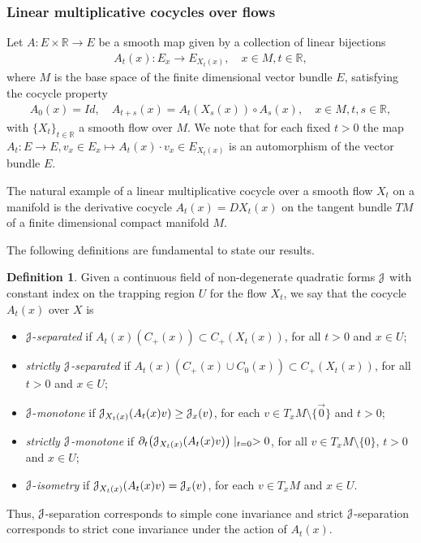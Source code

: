 \documentclass[12pt,reqno]{amsart}
\numberwithin{equation}{section}
\theoremstyle{plain}
\theoremstyle{definition}
\newtheorem{definition}{Definition}
\newcommand{\RR}{{\mathbb R}}
\newcommand{\J}{\EuScript{J}}
\begin{document}
\subsubsection{Linear multiplicative cocycles over flows}
\label{sec:linear-multipl-cocyc}

Let $A:E\times\RR\to E$ be a smooth map given by a collection of linear
bijections
\begin{align*}
  A_t(x): E_x\to E_{X_t(x)}, \quad x\in M, t\in\RR,
\end{align*}
where $M$ is the base space of the finite dimensional vector
bundle $E$, satisfying the cocycle property
\begin{align*}
  A_0(x)=Id, \quad A_{t+s}(x)=A_t(X_s(x))\circ A_s(x), \quad x\in M, t,s\in\RR,
\end{align*}
with $\{X_t\}_{t\in\RR}$ a smooth flow over $M$.  We note
that for each fixed $t>0$ the map $A_t: E\to E, v_x\in E_x
\mapsto A_t(x)\cdot v_x\in E_{X_t(x)}$ is an automorphism of
the vector bundle $E$.

The natural example of a linear multiplicative cocycle over
a smooth flow $X_t$ on a manifold is the derivative cocycle
$A_t(x)=DX_t(x)$ on the tangent bundle $TM$ of a finite
dimensional compact manifold $M$.

The following definitions are fundamental to state our
results.

\begin{definition}
\label{def:J-separated}
Given a continuous field of non-degenerate quadratic forms
$\J$ with constant index on the trapping region $U$ for the
flow $X_t$, we say that the cocycle $A_t(x)$ over $X$ is
\begin{itemize}
\item $\J$-\emph{separated} if $A_t(x)(C_+(x))\subset
  C_+(X_t(x))$, for all $t>0$ and $x\in U$;
\item \emph{strictly $\J$-separated} if $A_t(x)(C_+(x)\cup
  C_0(x))\subset C_+(X_t(x))$, for all $t>0$ and $x\in U$;
\item $\J$-\emph{monotone} if $\J_{X_t(x)}(A_t(x)v)\ge \J_x(v)$, for each $v\in
  T_xM\setminus\{\vec0\}$ and $t>0$;
\item \emph{strictly $\J$-monotone} if $\partial_t\big(\J_{X_t(x)}(A_t(x)v)\big)\mid_{t=0}>0$,
  for all $v\in T_xM\setminus\{0\}$, $t>0$ and $x\in U$;
\item $\J$-\emph{isometry} if $\J_{X_t(x)}(A_t(x)v) = \J_x(v)$, for each $v\in T_xM$ and $x\in U$.
\end{itemize}
\end{definition}
Thus, $\J$-separation corresponds to simple cone invariance
and strict $\J$-separation corresponds to strict cone
invariance under the action of $A_t(x)$.
\end{document}
